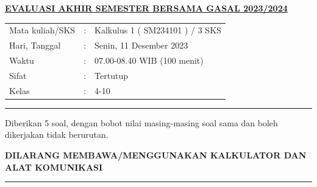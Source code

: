 \documentclass[11pt,a4paper]{article}
\newcounter{paket}
\begin{document}

    \begin{center}
	{\underline{\textbf{\MakeUppercase{Evaluasi Akhir Semester Bersama Gasal 2023/2024}}}}
    \end{center}

    \begin{center}
	\begin{tabular}{lcl}
		Mata kuliah/SKS & : & Kalkulus 1 ( SM234101 ) / 3 SKS\\
		Hari, Tanggal & : & Senin, 11 Desember 2023\\
		Waktu & : & 07.00-08.40 WIB (100 menit)\\
		Sifat & : & Tertutup\\
		Kelas & : & 4-10
	\end{tabular}
    \end{center}
	
    \noindent\rule{\textwidth}{2.pt}
	
    \setlength{\parindent}{5pt}
    \par Diberikan 5 soal, dengan bobot nilai masing-masing soal sama dan boleh dikerjakan tidak berurutan.
    \setlength{\parindent}{5pt}
    \setlength{\parindent}{5pt}
    {\small
    \par \textbf{\MakeUppercase{Dilarang membawa/menggunakan kalkulator dan alat komunikasi}}
    }
    \par {}
	
    \noindent\rule{\textwidth}{2.pt}
	
\end{document}
